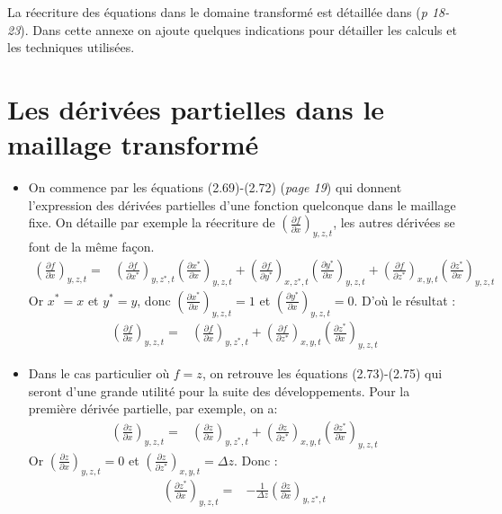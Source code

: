 La réecriture des équations dans le domaine transformé est détaillée dans \cite{hervouet007} (\textit{p 18-23}). Dans cette annexe on ajoute quelques indications pour détailler les calculs et les techniques utilisées.
\section*{Les dérivées partielles dans le maillage transformé}
\begin{itemize}
\item On commence par les équations (2.69)-(2.72) (\textit{page 19}) qui donnent l'expression des dérivées partielles d'une fonction quelconque dans le maillage fixe. On détaille par exemple la réecriture de $\left(\frac{\partial f}{\partial x}\right)_{y,z,t}$, les autres dérivées se font de la même façon. 
\begin{align*}
\left(\frac{\partial f}{\partial x}\right)_{y,z,t} = &
	\left(\frac{\partial f}{\partial x^*}\right)_{y,z^*,t} \left(\frac{\partial x^*}{\partial x}\right)_{y,z,t}
	+\left(\frac{\partial f}{\partial y^*}\right)_{x,z^*,t} \left(\frac{\partial y^*}{\partial x}\right)_{y,z,t}	
	+\left(\frac{\partial f}{\partial z^*}\right)_{x,y,t}\left(\frac{\partial z^*}{\partial x}\right)_{y,z,t}
\end{align*}
Or $x^* = x$ et $y^* = y$, donc $\left(\frac{\partial x^*}{\partial x}\right)_{y,z,t}=1$ et  $\left(\frac{\partial y^*}{\partial x}\right)_{y,z,t}=0$. D'où le résultat :
\begin{align*}
\left(\frac{\partial f}{\partial x}\right)_{y,z,t} = &
	\left(\frac{\partial f}{\partial x}\right)_{y,z^*,t}
	+\left(\frac{\partial f}{\partial z^*}\right)_{x,y,t}\left(\frac{\partial z^*}{\partial x}\right)_{y,z,t}
\end{align*}
\item Dans le cas particulier où $f=z$, on retrouve les équations (2.73)-(2.75) qui seront d'une grande utilité pour la suite des développements. Pour la première dérivée partielle, par exemple, on a:
\begin{align*}
\left(\frac{\partial z}{\partial x}\right)_{y,z,t} = &
	\left(\frac{\partial z}{\partial x}\right)_{y,z^*,t}
	+\left(\frac{\partial z}{\partial z^*}\right)_{x,y,t}\left(\frac{\partial z^*}{\partial x}\right)_{y,z,t}
\end{align*} 
Or $\left(\frac{\partial z}{\partial x}\right)_{y,z,t}=0$ et $\left(\frac{\partial z}{\partial z^*}\right)_{x,y,t} = \Delta z $. Donc :
\begin{align*}
\left(\frac{\partial z^*}{\partial x}\right)_{y,z,t}= & - \frac{1}{\Delta z} 
\left(\frac{\partial z}{\partial x}\right)_{y,z^*,t} 
\end{align*} 
\end{itemize}
